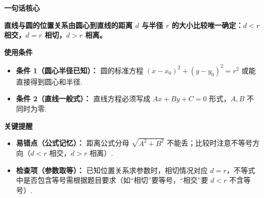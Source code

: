 \begin{summarybox}
	\textbf{\textcolor{CSummary}{一句话核心}}

	\textbf{直线与圆的位置关系由圆心到直线的距离 $d$ 与半径 $r$ 的大小比较唯一确定：$d<r$ 相交，$d=r$ 相切，$d>r$ 相离。}

	\medskip
	\textbf{\textcolor{CSummary}{使用条件}}
	\begin{itemize}[leftmargin=*, itemsep=0.5em, topsep=0.4em]
		\item \textbf{条件 1（圆心半径已知）：} 圆的标准方程 $(x-x_0)^2+(y-y_0)^2=r^2$ 或能直接得到圆心和半径.
		\item \textbf{条件 2（直线一般式）：} 直线方程必须写成 $Ax+By+C=0$ 形式，$A,B$ 不同时为零.
	\end{itemize}

	\medskip
	\textbf{\textcolor{CSummary}{关键提醒}}
	\begin{itemize}[leftmargin=*, itemsep=0.5em, topsep=0.4em]
		\item \textbf{易错点（公式记忆）：} 距离公式分母 $\sqrt{A^2+B^2}$ 不能丢；比较时注意不等号方向（$d<r$ 相交，$d>r$ 相离）.
		\item \textbf{检查项（参数取等）：} 已知位置关系求参数时，相切情况对应 $d=r$，不等式中是否包含等号需根据题目要求（如“相切”要等号，“相交”要 $d<r$ 不含等号）.
	\end{itemize}
\end{summarybox}
